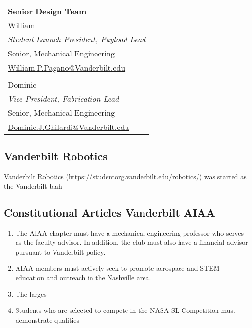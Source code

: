 \documentclass[class=article, crop=false]{standalone}
\begin{document}
	\pagebreak
	
	\FloatBarrier		
	\begin{table*} [h]
		\centering
		\begin{adjustbox}{max width=0.89\textwidth}
		\begin{tabular}{lll}
			\multicolumn{1}{L{0.3\linewidth}}{\textbf{Senior Design Team}} & \multicolumn{1}{C{0.3\linewidth}}{} & \multicolumn{1}{R{0.3\linewidth}}{}  \\
			\multicolumn{3}{l}{William} \\
			\multicolumn{3}{l}{\textit{Student Launch President, Payload Lead}} \\
			\multicolumn{3}{l}{Senior, Mechanical Engineering} \\
			\multicolumn{3}{l}{\href{mailto:William.P.Pagano@Vanderbilt.edu}{William.P.Pagano@Vanderbilt.edu}} \\
			& & \\
			\multicolumn{3}{l}{Dominic} \\
			\multicolumn{3}{l}{\textit{Vice President, Fabrication Lead}} \\
			\multicolumn{3}{l}{Senior, Mechanical Engineering} \\
			\multicolumn{3}{l}{\href{mailto:Dominic.J.Ghilardi@Vanderbilt.edu}{Dominic.J.Ghilardi@Vanderbilt.edu}} \\
			
		\end{tabular}
		\end{adjustbox}
	\end{table*}
	\FloatBarrier

		\pagebreak
		
		\subsection{Vanderbilt Robotics}
		Vanderbilt Robotics (\url{https://studentorg.vanderbilt.edu/robotics/}) was started as the Vanderbilt blah
	
		\subsection{Constitutional Articles Vanderbilt AIAA}
			\begin{enumerate}[label=\bfseries{\alph*.}]
				\item The AIAA chapter must have a mechanical engineering professor who serves as the faculty advisor. In addition, the club must also have a financial advisor pursuant to Vanderbilt policy.
				
				\item AIAA members must actively seek to promote aerospace and STEM education and outreach in the Nashville area.
				
				\item The larges
				
				\item Students who are selected to compete in the NASA SL Competition must demonstrate qualities 
			\end{enumerate}
	
\end{document}
